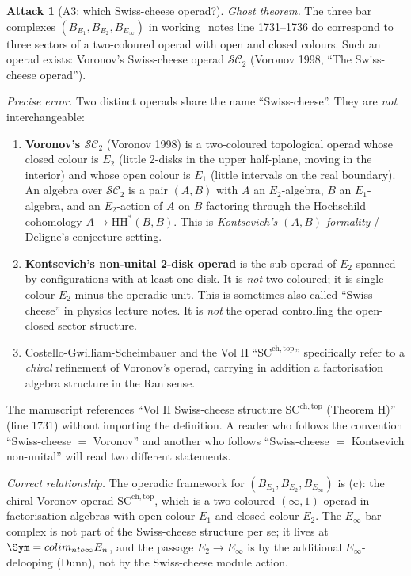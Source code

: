 \documentclass[11pt]{amsart}
\theoremstyle{definition}
\newtheorem{attack}{Attack}
\providecommand{\Eone}{E_1}
\providecommand{\Etwo}{E_2}
\providecommand{\Einf}{E_\infty}
\begin{document}
\begin{attack}[A3: which Swiss-cheese operad?]\leavevmode

\noindent\emph{Ghost theorem.} The three bar complexes
$(B_{\Eone}, B_{\Etwo}, B_{\Einf})$ in working\_notes line 1731--1736
do correspond to three sectors of a two-coloured operad with open and
closed colours. Such an operad exists: Voronov's Swiss-cheese operad
$\mathcal{SC}_2$ (Voronov 1998, ``The Swiss-cheese operad'').

\noindent\emph{Precise error.} Two distinct operads share the name
``Swiss-cheese''. They are {\em not} interchangeable:

\begin{enumerate}[label=(\alph*)]
 \item \textbf{Voronov's $\mathcal{SC}_2$} (Voronov 1998) is a
   two-coloured topological operad whose closed colour is $E_2$ (little
   2-disks in the upper half-plane, moving in the interior) and whose
   open colour is $E_1$ (little intervals on the real boundary). An
   algebra over $\mathcal{SC}_2$ is a pair $(A, B)$ with $A$ an
   $E_2$-algebra, $B$ an $E_1$-algebra, and an $E_2$-action of $A$ on
   $B$ factoring through the Hochschild cohomology $A \to \mathrm{HH}^*(B,B)$.
   This is {\em Kontsevich's $(A, B)$-formality} / Deligne's conjecture
   setting.
 \item \textbf{Kontsevich's non-unital 2-disk operad} is the sub-operad
   of $E_2$ spanned by configurations with at least one disk. It is
   {\em not} two-coloured; it is single-colour $E_2$ minus the operadic
   unit. This is sometimes also called ``Swiss-cheese'' in physics
   lecture notes. It is {\em not} the operad controlling the
   open-closed sector structure.
 \item Costello-Gwilliam-Scheimbauer and the Vol II
   ``$\mathrm{SC}^{\mathrm{ch,top}}$'' specifically refer to a
   {\em chiral} refinement of Voronov's operad, carrying in addition
   a factorisation algebra structure in the Ran sense.
\end{enumerate}

The manuscript references ``Vol II Swiss-cheese structure
$\mathrm{SC}^{\mathrm{ch,top}}$ (Theorem H)'' (line 1731) without
importing the definition. A reader who follows the convention
``Swiss-cheese $=$ Voronov'' and another who follows ``Swiss-cheese
$=$ Kontsevich non-unital'' will read two different statements.

\noindent\emph{Correct relationship.} The operadic framework for
$(B_{\Eone}, B_{\Etwo}, B_{\Einf})$ is (c): the chiral Voronov
operad $\mathrm{SC}^{\mathrm{ch,top}}$, which is a two-coloured
$(\infty,1)$-operad in factorisation algebras with open colour $\Eone$
and closed colour $\Etwo$. The $\Einf$ bar complex is not part of
the Swiss-cheese structure per se; it lives at
$\Sym = \mathrm{colim}_{n\to\infty} E_n$, and the passage
$\Etwo \to \Einf$ is by the additional $\Einf$-delooping (Dunn), not
by the Swiss-cheese module action.
\end{attack}
\end{document}
